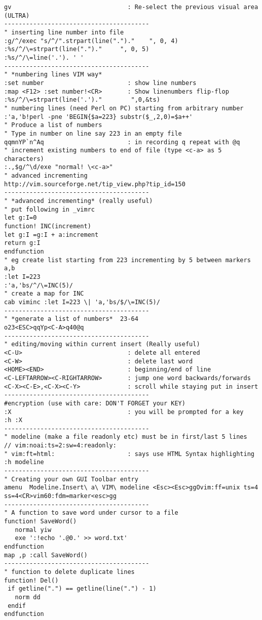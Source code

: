 \documentclass[10pt,landscape]{article}
\begin{document}
\begin{multicols}{2}
\begin{verbatim}
gv                                : Re-select the previous visual area (ULTRA)
----------------------------------------
" inserting line number into file
:g/^/exec "s/^/".strpart(line(".")."    ", 0, 4)
:%s/^/\=strpart(line(".")."     ", 0, 5)
:%s/^/\=line('.'). ' '
----------------------------------------
" *numbering lines VIM way*
:set number                       : show line numbers
:map <F12> :set number!<CR>       : Show linenumbers flip-flop
:%s/^/\=strpart(line('.')."        ",0,&ts)
" numbering lines (need Perl on PC) starting from arbitrary number
:'a,'b!perl -pne 'BEGIN{$a=223} substr($_,2,0)=$a++'
" Produce a list of numbers
" Type in number on line say 223 in an empty file
qqmnYP`n^Aq                       : in recording q repeat with @q
" increment existing numbers to end of file (type <c-a> as 5 characters)
:.,$g/^\d/exe "normal! \<c-a>"
" advanced incrementing
http://vim.sourceforge.net/tip_view.php?tip_id=150
----------------------------------------
" *advanced incrementing* (really useful)
" put following in _vimrc
let g:I=0
function! INC(increment)
let g:I =g:I + a:increment
return g:I
endfunction
" eg create list starting from 223 incrementing by 5 between markers a,b
:let I=223
:'a,'bs/^/\=INC(5)/
" create a map for INC
cab viminc :let I=223 \| 'a,'bs/$/\=INC(5)/
----------------------------------------
" *generate a list of numbers*  23-64
o23<ESC>qqYp<C-A>q40@q
----------------------------------------
" editing/moving within current insert (Really useful)
<C-U>                             : delete all entered
<C-W>                             : delete last word
<HOME><END>                       : beginning/end of line
<C-LEFTARROW><C-RIGHTARROW>       : jump one word backwards/forwards
<C-X><C-E>,<C-X><C-Y>             : scroll while staying put in insert
----------------------------------------
#encryption (use with care: DON'T FORGET your KEY)
:X                                : you will be prompted for a key
:h :X
----------------------------------------
" modeline (make a file readonly etc) must be in first/last 5 lines
// vim:noai:ts=2:sw=4:readonly:
" vim:ft=html:                    : says use HTML Syntax highlighting
:h modeline
----------------------------------------
" Creating your own GUI Toolbar entry
amenu  Modeline.Insert\ a\ VIM\ modeline <Esc><Esc>ggOvim:ff=unix ts=4 ss=4<CR>vim60:fdm=marker<esc>gg
----------------------------------------
" A function to save word under cursor to a file
function! SaveWord()
   normal yiw
   exe ':!echo '.@0.' >> word.txt'
endfunction
map ,p :call SaveWord()
----------------------------------------
" function to delete duplicate lines
function! Del()
 if getline(".") == getline(line(".") - 1)
   norm dd
 endif
endfunction


\end{verbatim}
\end{multicols}
\end{document}
